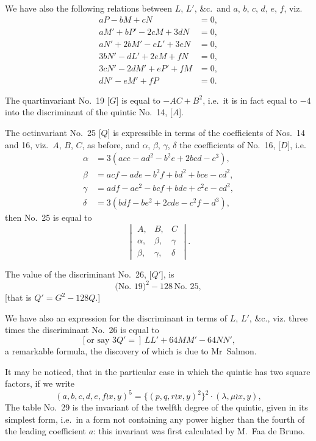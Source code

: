\documentclass[11pt,a4paper]{article}
\begin{document}
\clearpage
We have also the following relations between $L$, $L'$, \&c.\ and $a$, $b$, $c$, $d$, $e$, $f$,
viz.
\begin{align*}
aP - bM + cN &= 0,\\
aM' + bP' - 2cM + 3dN &= 0,\\
aN' + 2bM' - cL' + 3eN &= 0,\\
3bN' - dL' + 2eM + fN &= 0,\\
3cN' - 2dM' + eP' + fM &= 0,\\
dN' - eM' + fP &= 0.
\end{align*}

The quartinvariant No.~19 [$G$] is equal to $-AC + B^2$,
i.e.\ it is in fact equal to $-4$ into the discriminant of the quintic No.~14, [$A$].

The octinvariant No.~25 [$Q$] is expressible in terms of the coefficients of Nos.~14 and 16,
viz.\ $A$, $B$, $C$, as before, and $\alpha$, $\beta$, $\gamma$, $\delta$ the coefficients of No.~16, [$D$],
i.e.
\begin{align*}
\alpha &= 3(ace - ad^2 - b^2e + 2bcd - c^3),\\
\beta &= acf - ade - b^2f + bd^2 + bce - cd^2,\\
\gamma &= adf - ae^2 - bcf + bde + c^2e - cd^2,\\
\delta &= 3(bdf - be^2 + 2cde - c^2f - d^3),
\end{align*}
then No.~25 is equal to
\[
\begin{vmatrix}
A, & B, & C \\
\alpha, & \beta, & \gamma \\
\beta, & \gamma, & \delta
\end{vmatrix}
.\]

The value of the discriminant No.~26, [$Q'$], is
\[\text{(No.~19)}^2 - 128\,\text{No.~25},\]
[that is $Q' = G^2 - 128Q$.]

We have also an expression for the discriminant in terms of $L$, $L'$, \&c., viz.
three times the discriminant No.~26 is equal to
\[[\text{or say }3Q' =]\, LL' + 64MM' - 64NN',\]
a remarkable formula, the discovery of which is due to Mr~Salmon.

It may be noticed, that in the particular case in which the quintic has two square
factors, if we write
\[(a, b, c, d, e, f \wr x, y)^5 = \{(p, q, r \wr x, y)^2\}^2 \cdot (\lambda, \mu \wr x, y),\]
\clearpage
The table No.~29 is the invariant of the twelfth degree of the quintic,
given in its simplest form, i.e.\ in a form not containing any power higher than
the fourth of the leading coefficient $a$: this invariant was first calculated by M.~Faa de Bruno.
\end{document}
